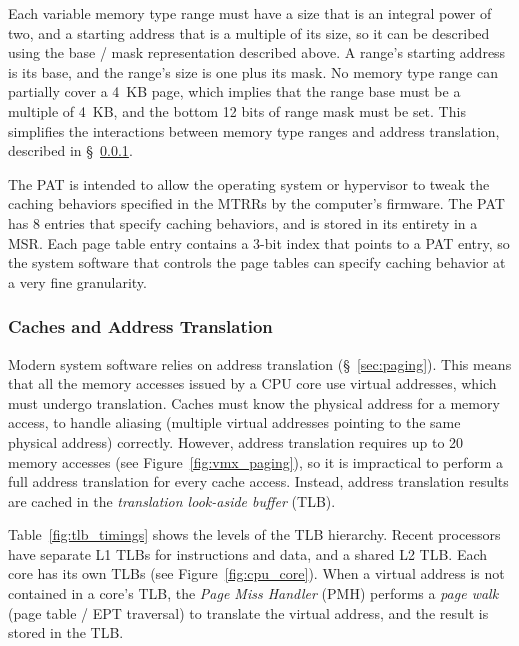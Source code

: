Each variable memory type range must have a size that is an integral power of
two, and a starting address that is a multiple of its size, so it can be
described using the base / mask representation described above. A range's
starting address is its base, and the range's size is one plus its mask. No
memory type range can partially cover a 4~KB page, which implies that the range
base must be a multiple of 4~KB, and the bottom 12 bits of range mask must be
set. This simplifies the interactions between memory type ranges and address
translation, described in \S~\ref{sec:tlbs}.

The PAT is intended to allow the operating system or hypervisor to tweak the
caching behaviors specified in the MTRRs by the computer's firmware. The PAT
has 8 entries that specify caching behaviors, and is stored in its entirety in
a MSR. Each page table entry contains a 3-bit index that points to a PAT entry,
so the system software that controls the page tables can specify caching
behavior at a very fine granularity.


\subsubsection{Caches and Address Translation}
\label{sec:tlbs}

Modern system software relies on address translation (\S~\ref{sec:paging}).
This means that all the memory accesses issued by a CPU core use virtual
addresses, which must undergo translation. Caches must know the physical
address for a memory access, to handle aliasing (multiple virtual addresses
pointing to the same physical address) correctly. However, address translation
requires up to 20 memory accesses (see Figure~\ref{fig:vmx_paging}), so it is
impractical to perform a full address translation for every cache access.
Instead, address translation results are cached in the \textit{translation
look-aside buffer} (TLB).

Table~\ref{fig:tlb_timings} shows the levels of the TLB hierarchy. Recent
processors have separate L1 TLBs for instructions and data, and a shared L2
TLB. Each core has its own TLBs (see Figure~\ref{fig:cpu_core}). When a virtual
address is not contained in a core's TLB, the \textit{Page Miss Handler} (PMH)
performs a \textit{page walk} (page table / EPT traversal) to translate the
virtual address, and the result is stored in the TLB.

